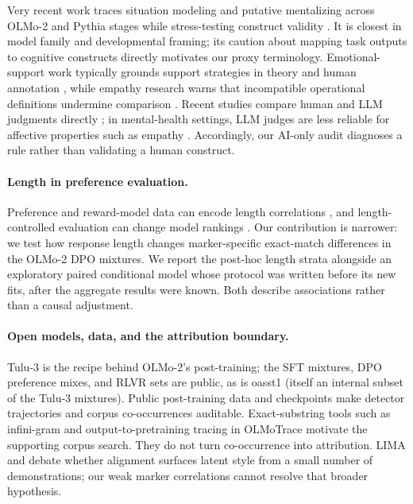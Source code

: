 \documentclass[11pt]{article}
\begin{document}
Very recent work traces situation modeling and putative mentalizing across
OLMo-2 and Pythia stages while stress-testing construct validity
\citep{riviere2026developmental}. It is closest in model family and
developmental framing; its caution about mapping task outputs to cognitive
constructs directly motivates our proxy terminology. Emotional-support work
typically grounds support strategies in theory and human annotation
\citep{liu2021emotional}, while empathy research warns that incompatible
operational definitions undermine comparison \citep{lahnala2022critical}.
Recent studies compare human and LLM judgments directly
\citep{welivita2026empathetic}; in mental-health settings, LLM judges are less
reliable for affective properties such as empathy \citep{badawi2026trust}.
Accordingly, our AI-only audit diagnoses a rule rather than validating a human
construct.

\paragraph{Length in preference evaluation.}
Preference and reward-model data can encode length correlations
\citep{singhal2023long}, and length-controlled evaluation can change model
rankings \citep{dubois2024length}. Our contribution is narrower: we test how
response length changes marker-specific exact-match differences in the OLMo-2
DPO mixtures. We report the post-hoc length strata alongside an exploratory
paired conditional model whose protocol was written before its new fits, after
the aggregate results were known. Both describe associations rather than a
causal adjustment.

\paragraph{Open models, data, and the attribution boundary.}
Tulu-3 \citep{lambert2024tulu3} is the recipe behind OLMo-2's post-training;
the SFT mixtures, DPO preference mixes, and RLVR sets are public, as is oasst1
\citep{kopf2023oasst1} (itself an internal subset of the Tulu-3 mixtures).
Public post-training data and checkpoints make detector trajectories and corpus
co-occurrences auditable. Exact-substring tools such as infini-gram
\citep{liu2024infinigram} and output-to-pretraining tracing in OLMoTrace
\citep{liu2025olmotrace} motivate the supporting corpus search. They do not
turn co-occurrence into attribution. LIMA \citep{zhou2023lima} and
\citet{ghosh2024closer} debate whether alignment surfaces latent style from a
small number of demonstrations; our weak marker correlations cannot resolve
that broader hypothesis.
\end{document}
